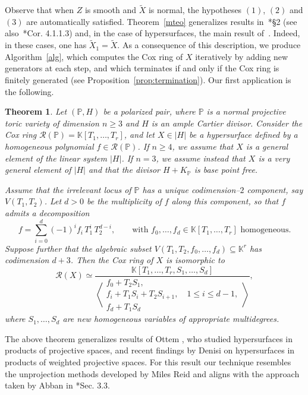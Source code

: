 \documentclass{amsart}
\newtheorem{introthm}{Theorem}
\theoremstyle{definition}
\theoremstyle{remark}
\begin{document}
Observe that when $Z$ is smooth and $\tilde X$ is normal, the hypotheses $(1)$, $(2)$ and $(3)$ are automatically satisfied.
Theorem~\ref{mteo} generalizes results in~\cite{hau}*{\S 2} (see also~\cite{adhl}*{Cor. 4.1.1.3}) and, in the case of hypersurfaces, the main result of~\cite{al}. Indeed, in these cases, one has $\tilde X_1 = \tilde X$. As a consequence of this description, we produce Algorithm~\ref{alg}, which computes the Cox ring of $X$ iteratively by adding new generators at each step, and which terminates if and only if the Cox ring is finitely generated (see Proposition~\ref{prop:termination}). Our first application is the following.

\begin{introthm}\label{main-teo}
Let $(\mathbb{P},H)$ be a polarized pair, where $\mathbb{P}$ is a normal projective toric variety of dimension $n \geq 3$ and $H$ is an ample Cartier divisor.
Consider the Cox ring
$\mathcal{R}(\mathbb{P}) = \mathbb{K}[T_1, \dots, T_r]$,
and let $X \in |H|$ be a hypersurface defined by a homogeneous polynomial $f \in \mathcal{R}(\mathbb{P})$.
If $n \geq 4$, we assume that $X$ is a general element of the linear system $|H|$.
If $n = 3$, we assume instead that $X$ is a very general element of $|H|$ and that the divisor $H+K_{\mathbb P}$ is base point free.

Assume that the irrelevant locus of $\mathbb P$ has a unique codimension--$2$ component, say $V(T_1,T_2)$.
Let $d>0$ be the multiplicity of $f$ along this component, so that $f$ admits a decomposition
\[
f = \sum_{i=0}^d (-1)^i f_i\, T_1^i\, T_2^{d-i},
\qquad
\text{with } f_0,\dots,f_d \in \mathbb{K}[T_1, \dots, T_r] \text{ homogeneous}.
\]
Suppose further that the algebraic subset
$V(T_1, T_2, f_0, \dots, f_d) \subseteq \mathbb{K}^r$
has codimension $d+3$. Then the Cox ring of $X$ is isomorphic to
\[
\mathcal{R}(X) \simeq
\frac{\mathbb{K}[T_1, \dots, T_r, S_1, \dots, S_d]}{
\left\langle
\begin{array}{l}
f_0 + T_2 S_1, \\[3pt]
f_i + T_1 S_i + T_2 S_{i+1}, \quad 1 \leq i \leq d-1, \\[3pt]
f_d + T_1 S_d
\end{array}
\right\rangle},
\]
where $S_1, \dots, S_d$ are new homogeneous variables of appropriate multidegrees.
\end{introthm}

The above theorem generalizes results of Ottem \cite{ott}, who studied hypersurfaces in products of projective spaces, and recent findings by Denisi \cite{denisi} on hypersurfaces in products of weighted projective spaces. For this result
our technique resembles the unprojection methods developed by Miles Reid \cite{reid} and aligns with the approach taken by Abban in \cite{abban2}*{Sec. 3.3}.
\end{document}
